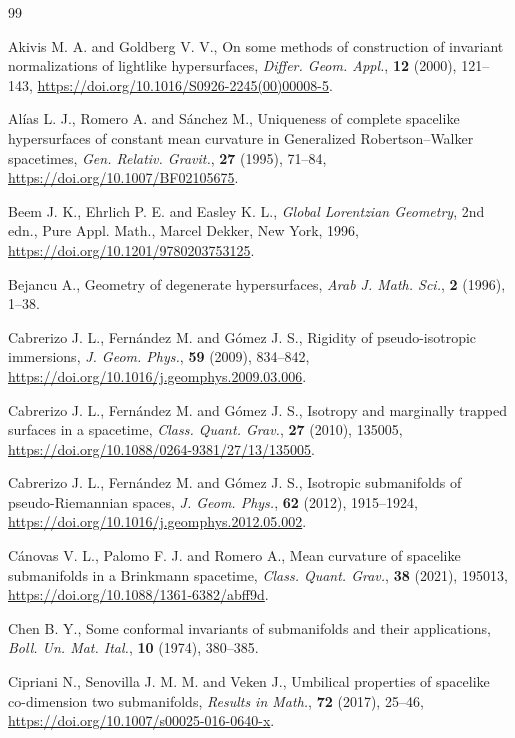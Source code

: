 \documentclass[11pt]{article}
\numberwithin{equation}{section}
\begin{document}
	\begin{thebibliography}{99}
		
		Akivis M. A. and Goldberg V. V., On some methods of construction of invariant normalizations of lightlike hypersurfaces, \emph{Differ. Geom. Appl.}, \textbf{12} (2000), 121--143, \url{https://doi.org/10.1016/S0926-2245(00)00008-5}.
		
		Alías L. J., Romero A. and Sánchez M.,
		Uniqueness of complete spacelike hypersurfaces of constant mean curvature in Generalized Robertson--Walker spacetimes,
		\emph{Gen. Relativ. Gravit.}, \textbf{27} (1995), 71--84, \url{https://doi.org/10.1007/BF02105675}.
		
		Beem J. K., Ehrlich P. E. and Easley K. L., {\it Global Lorentzian Geometry}, 2nd edn., Pure Appl. Math., Marcel Dekker, New York, 1996, \url{https://doi.org/10.1201/9780203753125}.
		
		Bejancu A., Geometry of degenerate hypersurfaces, \emph{Arab J. Math. Sci.}, \textbf{2} (1996), 1--38.
		
		Cabrerizo J. L., Fern\'{a}ndez M. and G\'{o}mez J. S.,
		Rigidity of pseudo-isotropic immersions, \emph{J. Geom. Phys.},
		\textbf{59} (2009), 834--842, \url{https://doi.org/10.1016/j.geomphys.2009.03.006}.
		
		Cabrerizo J. L., Fern\'{a}ndez M. and G\'{o}mez J. S., Isotropy and marginally trapped surfaces in a spacetime,
		\emph{Class. Quant. Grav.}, \textbf{27} (2010), 135005, \url{https://doi.org/10.1088/0264-9381/27/13/135005}.
		
		Cabrerizo J. L., Fern\'{a}ndez M. and G\'{o}mez J. S., Isotropic submanifolds of pseudo-Riemannian spaces,
		\emph{J. Geom. Phys.}, \textbf{62} (2012), 1915--1924, \url{https://doi.org/10.1016/j.geomphys.2012.05.002}.
		
		Cánovas V. L.,  Palomo F. J. and Romero A., Mean curvature of spacelike submanifolds in a Brinkmann spacetime, {\it Class. Quant. Grav.}, {\bf 38} (2021), 195013, \url{https://doi.org/10.1088/1361-6382/abff9d}.
		
		Chen B. Y., Some conformal invariants of submanifolds and their applications,
		\emph{Boll. Un. Mat. Ital.}, \textbf{10} (1974), 380--385.
		
		Cipriani N.,  Senovilla J. M. M. and Veken J., Umbilical properties of spacelike co-dimension two submanifolds, \emph{Results in Math.}, \textbf{72} (2017), 25--46, \url{https://doi.org/10.1007/s00025-016-0640-x}.
		

\end{thebibliography}
\end{document}
